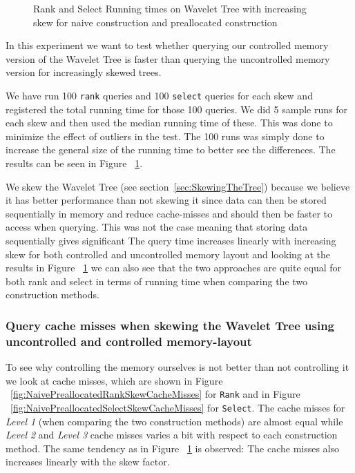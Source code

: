 \begin{figure}
\caption{Rank and Select Running times on Wavelet Tree with increasing skew for naive construction and preallocated construction}
\label{fig:NaiveRankSelectSkewRunningTime}

\end{figure}


In this experiment we want to test whether querying our controlled memory version of the Wavelet Tree is faster than querying the uncontrolled memory version for increasingly skewed trees. 

We have run 100 \texttt{rank} queries and 100 \texttt{select} queries for each skew and registered the total running time for those 100 queries. 
We did 5 sample runs for each skew and then used the median running time of these. 
This was done to minimize the effect of outliers in the test. The 100 runs was simply done to increase the general size of the running time to better see the differences. The results can be seen in Figure ~\ref{fig:NaiveRankSelectSkewRunningTime}.

We skew the Wavelet Tree (see section~\ref{sec:SkewingTheTree}) because we believe it has better performance than not skewing it since data can then be stored sequentially in memory and reduce cache-misses and should then be faster to access when querying. 
This was not the case meaning that storing data sequentially gives significant 
The query time increases linearly with increasing skew for both controlled and uncontrolled memory layout and looking at the results in Figure ~\ref{fig:NaiveRankSelectSkewRunningTime} we can also see that the two approaches are quite equal for both rank and select in terms of running time when comparing the two construction methods.

\subsubsection{Query cache misses when skewing the Wavelet Tree using uncontrolled and controlled memory-layout}
To see why controlling the memory ourselves is not better than not controlling it we look at cache misses, which are shown in Figure ~\ref{fig:NaivePreallocatedRankSkewCacheMisses} for \texttt{Rank} and in Figure ~\ref{fig:NaivePreallocatedSelectSkewCacheMisses} for \texttt{Select}.
The cache misses for \textit{Level 1} (when comparing the two construction methods) are almost equal while \textit{Level 2} and \textit{Level 3} cache misses varies a bit with respect to each construction method. 
The same tendency as in Figure ~\ref{fig:NaiveRankSelectSkewRunningTime} is observed: 
The cache misses also increases linearly with the skew factor. 

